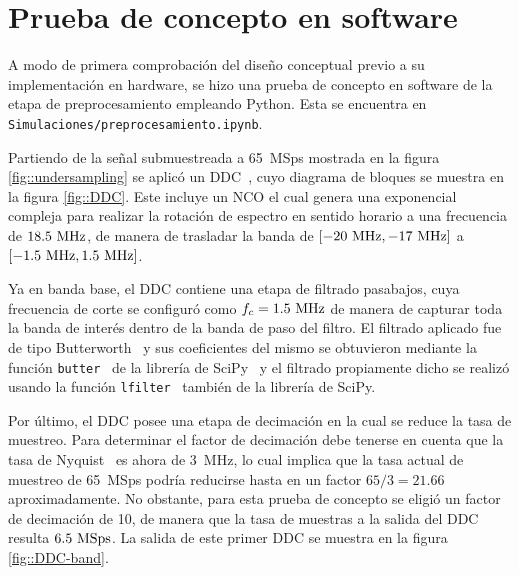 \documentclass[../../main.tex]{subfiles}
\begin{document}


\section{Prueba de concepto en software}
A modo de primera comprobación del diseño conceptual previo a su implementación en hardware, se hizo una prueba de concepto en software de la etapa de preprocesamiento empleando Python. 
Esta se encuentra en \texttt{Simulaciones/preprocesamiento.ipynb}. 

Partiendo de la señal submuestreada a 65~MSps mostrada en la figura \ref{fig::undersampling} se aplicó un DDC~\cite{DDC}, cuyo diagrama de bloques se muestra en la figura \ref{fig::DDC}. 
Este incluye un NCO el cual genera una exponencial compleja para realizar la rotación de espectro en sentido horario a una frecuencia de $18.5~\textrm{MHz}$, de manera de trasladar la banda de $[-20~\textrm{MHz}, -17~\textrm{MHz}]$ a $[-1.5~\textrm{MHz}, 1.5~\textrm{MHz}]$. 

Ya en banda base, el DDC contiene una etapa de filtrado pasabajos, cuya frecuencia de corte se configuró como $f_c = 1.5~\textrm{MHz}$ de manera de capturar toda la banda de interés dentro de la banda de paso del filtro. El filtrado aplicado fue de tipo Butterworth~\cite{Butterworth} y sus coeficientes del mismo se obtuvieron mediante la función \texttt{butter}~\cite{butter} de la librería de SciPy~\cite{scipy} y el filtrado propiamente dicho se realizó usando la función \texttt{lfilter}~\cite{lfilter} también de la librería de SciPy. 

Por último, el DDC posee una etapa de decimación en la cual se reduce la tasa de muestreo. Para determinar el factor de decimación debe tenerse en cuenta que la tasa de Nyquist~\cite{Nyquist-rate} es ahora de 3~MHz, lo cual implica que la tasa actual de muestreo de 65~MSps podría reducirse hasta en un factor $65/3 = 21.66$ aproximadamente. 
No obstante, para esta prueba de concepto se eligió un factor de decimación de 10, de manera que la tasa de muestras a la salida del DDC resulta $6.5~\textrm{MSps}$. La salida de este primer DDC se muestra en la figura \ref{fig::DDC-band}.
\end{document}
